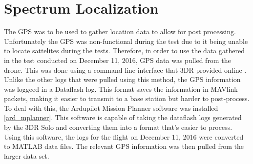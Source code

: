 \section{Spectrum Localization}
The GPS was to be used to gather location data to allow for post processing. Unfortunately the GPS was non-functional during the test due to it being unable to locate sattelites during the tests. Therefore, in order to use the data gathered in the test conducted on December 11, 2016, GPS 
data was pulled from the drone. This was done using a command-line interface that 
3DR provided online \cite{3dr_devguide}. Unlike the other logs that were pulled using this method,
the GPS information was loggeed in a Dataflash log. This format saves the information
in MAVlink packets, making it easier to transmit to a base station but harder
to post-process. To deal with this, the Ardupilot Mission Planner software was 
installed \ref{ard_mplanner}. This software is capable of taking the dataflash logs
generated by the 3DR Solo and converting them into a format that's easier to
process. Using this software, the logs for the flight on December 11, 2016 were 
converted to MATLAB data files. The relevant GPS information was then pulled from
the larger data set. \par

